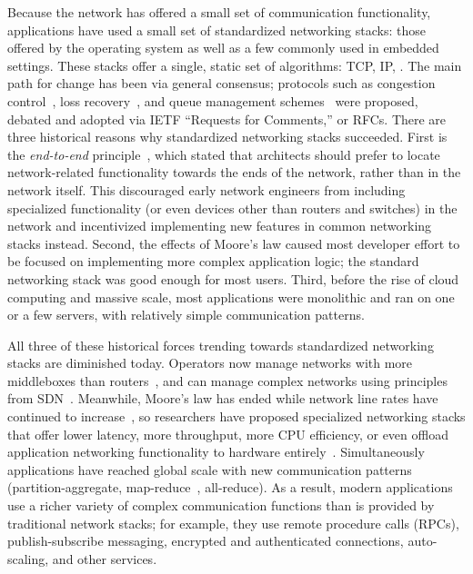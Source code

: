 \documentclass[fontsize=12pt,paper=letter]{scrartcl}
\begin{document}
Because the network has offered a small set of communication functionality, applications have used a small set of standardized networking stacks: those offered by the operating system as well as a few commonly used in embedded settings. 
These stacks offer a single, static set of algorithms: TCP, IP, \etc. 
The main path for change has been via general consensus; \eg protocols such as congestion control~\cite{tcp-westwood-rfc}, loss recovery~\cite{fast-recovery-rfc, sacks}, and queue management schemes~\cite{red, pie, fq} were proposed, debated and adopted via IETF ``Requests for Comments,'' or RFCs.
There are three historical reasons why standardized networking stacks succeeded.
First is the \emph{end-to-end} principle~\cite{e2e}, which stated that architects should prefer to locate network-related functionality towards the ends of the network, rather than in the network itself.
This discouraged early network engineers from including specialized functionality (or even devices other than routers and switches) in the network and incentivized implementing new features in common networking stacks instead.
Second, the effects of Moore's law caused most developer effort to be focused on implementing more complex application logic; the standard networking stack was good enough for most users.
Third, before the rise of cloud computing and massive scale, most applications were monolithic and ran on one or a few servers, with relatively simple communication patterns. 

All three of these historical forces trending towards standardized networking stacks are diminished today. 
Operators now manage networks with more middleboxes than routers~\cite{aplomb}, and can manage complex networks using principles from SDN~\cite{ethane, openflow}. 
Meanwhile, Moore's law has ended while network line rates have continued to increase~\cite{isca-moore}, so researchers have proposed specialized networking stacks that offer lower latency, more throughput, more CPU efficiency, or even offload application networking functionality to hardware entirely~\cite{netmap, ix, arrakis, zygos, mtcp, shenango, farm, erpc, tonic}.
Simultaneously applications have reached global scale with new communication patterns (partition-aggregate, map-reduce~\cite{mapreduce}, all-reduce).
As a result, modern applications use a richer variety of complex communication functions than is provided by traditional network stacks; for example, they use remote procedure calls (RPCs), publish-subscribe messaging, encrypted and authenticated connections, auto-scaling, and other services. 
\end{document}
